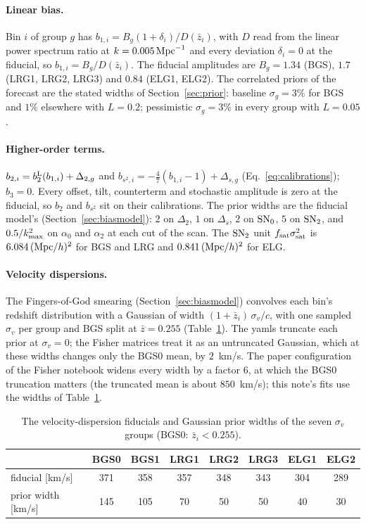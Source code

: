 \documentclass[11pt]{article}
\newcommand{\kmax}{k_{\rm max}}
\newcommand{\bstwo}{b_{s^2}}
\newcommand{\SNz}{{\rm SN}_0}
\newcommand{\SNt}{{\rm SN}_2}
\begin{document}
\paragraph{Linear bias.}
Bin $i$ of group $g$ has $b_{1,i} = B_g (1 + \delta_i)/D(\bar{z}_i)$,
with $D$ read from the linear power spectrum ratio at
$k = 0.005\,{\rm Mpc}^{-1}$ and every deviation $\delta_i = 0$ at the
fiducial, so $b_{1,i} = B_g/D(\bar{z}_i)$.  The fiducial amplitudes are
$B_g = 1.34$ (BGS), $1.7$ (LRG1, LRG2, LRG3) and $0.84$ (ELG1, ELG2).
The correlated priors of the forecast are the stated widths of
Section~\ref{sec:prior}: baseline $\sigma_g = 3\%$ for BGS and $1\%$
elsewhere with $L = 0.2$; pessimistic $\sigma_g = 3\%$ in every group
with $L = 0.05$.

\paragraph{Higher-order terms.}
$b_{2,i} = b_2^{\rm L}(b_{1,i}) + \Delta_{2,g}$ and
$b_{s^2,i} = -\tfrac{4}{7}(b_{1,i} - 1) + \Delta_{s,g}$
(Eq.~\eqref{eq:calibrations}); $b_3 = 0$.  Every offset, tilt,
counterterm and stochastic amplitude is zero at the fiducial, so $b_2$
and $\bstwo$ sit on their calibrations.  The prior widths are the
fiducial model's (Section~\ref{sec:biasmodel}): $2$ on $\Delta_2$, $1$ on
$\Delta_s$, $2$ on $\SNz$, $5$ on $\SNt$, and $0.5/\kmax^2$ on
$\alpha_0$ and $\alpha_2$ at each cut of the scan.  The $\SNt$ unit
$f_{\rm sat}\sigma_{\rm sat}^2$ is $6.084\,({\rm Mpc}/h)^2$ for BGS and
LRG and $0.841\,({\rm Mpc}/h)^2$ for ELG.

\paragraph{Velocity dispersions.}
The Fingers-of-God smearing (Section~\ref{sec:biasmodel}) convolves
each bin's redshift distribution
with a Gaussian of width $(1 + \bar{z}_i)\,\sigma_v/c$, with one
sampled $\sigma_v$ per group and BGS split at $\bar{z} = 0.255$
(Table~\ref{tab:sigv}).  The yamls truncate each prior at
$\sigma_v = 0$; the Fisher matrices treat it as an untruncated
Gaussian, which at these widths changes only the BGS0 mean, by
$2$~km/s.  The paper configuration of the Fisher notebook widens every
width by a factor $6$, at which the BGS0 truncation matters (the
truncated mean is about $850$~km/s); this note's fits use the widths
of Table~\ref{tab:sigv}.

\begin{table}[tbp]
  \centering
  \begin{tabular}{lccccccc}
    \hline
    & BGS0 & BGS1 & LRG1 & LRG2 & LRG3 & ELG1 & ELG2 \\
    \hline
    fiducial [km/s] & 371 & 358 & 357 & 348 & 343 & 304 & 289 \\
    prior width [km/s] & 145 & 105 & 70 & 50 & 50 & 40 & 30 \\
    \hline
  \end{tabular}
  \caption{The velocity-dispersion fiducials and Gaussian prior widths
    of the seven $\sigma_v$ groups (BGS0: $\bar{z}_i < 0.255$).}
  \label{tab:sigv}
\end{table}
\end{document}
